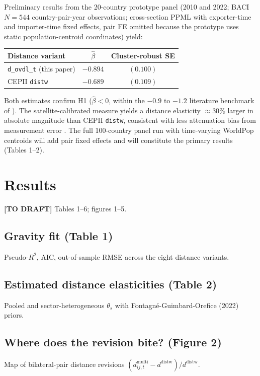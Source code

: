 \documentclass[11pt, a4paper]{article}
\newcommand{\dij}{d_{ij,t}}
\newcommand{\thetas}{\theta_s}
\begin{document}
Preliminary results from the 20-country prototype panel (2010 and 2022; BACI
$N=544$ country-pair-year observations; cross-section PPML with exporter-time
and importer-time fixed effects, pair FE omitted because the prototype uses
static population-centroid coordinates) yield:
\begin{center}
\begin{tabular}{lcc}
\hline
Distance variant & $\hat\beta$ & Cluster-robust SE \\
\hline
\texttt{d\_ovdl\_t} (this paper) & $-0.894$ & $(0.100)$ \\
CEPII \texttt{distw}             & $-0.689$ & $(0.109)$ \\
\hline
\end{tabular}
\end{center}
Both estimates confirm H1 ($\hat\beta < 0$, within the $-0.9$ to $-1.2$
literature benchmark of \citealt{disdier_head_2008}).  The satellite-calibrated
measure yields a distance elasticity $\approx 30\%$ larger in absolute magnitude
than CEPII \texttt{distw}, consistent with less attenuation bias from
measurement error \citep{head_mayer_2014}.  The full 100-country panel run with
time-varying WorldPop centroids will add pair fixed effects and will
constitute the primary results (Tables 1--2).

\section{Results}
\label{sec:results}

\textbf{[TO DRAFT]} Tables 1--6; figures 1--5.

\subsection{Gravity fit (Table 1)}
Pseudo-$R^2$, AIC, out-of-sample RMSE across the eight distance variants.

\subsection{Estimated distance elasticities (Table 2)}
Pooled and sector-heterogeneous $\thetas$ with Fontagn{\'e}-Guimbard-Orefice (2022) priors.

\subsection{Where does the revision bite? (Figure 2)}
Map of bilateral-pair distance revisions $(\dij^{\text{multi}} - d^{\text{distw}}) / d^{\text{distw}}$.
\end{document}

